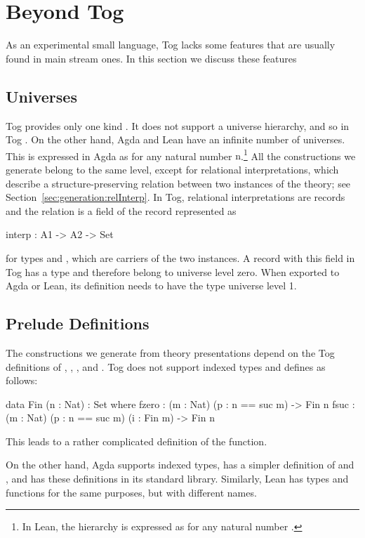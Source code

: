 \section{Beyond Tog}
\label{sec:beyongTog}
As an experimental small language, Tog lacks some features that are usually found in main stream ones. In this section we discuss these features 

\subsection{Universes}
Tog provides only one kind . It does not support a universe hierarchy, and so in Tog . On the other hand, Agda and Lean have an infinite number of universes. This is expressed in Agda as 
 for any natural number $\text{n}$.\footnote{In Lean, the hierarchy is expressed as  for any natural number .}
All the constructions we generate belong to the same level, except for relational interpretations, which describe a structure-preserving relation between two instances of the theory; see Section~\ref{sec:generation:relInterp}. In Tog, relational interpretations are records and the relation is a field of the record represented as 
\begin{togcode}
interp : A1 -> A2 -> Set
\end{togcode}
\noindent for types  and , which are carriers of the two instances. 
A record with this field in Tog has a type  and therefore belong to universe level zero. When exported to Agda or Lean, its definition needs to have the type universe level 1.  

\subsection{Prelude Definitions}
The constructions we generate from theory presentations depend on the Tog definitions of , , , and . Tog does not support indexed types and defines  as follows:
\begin{togcode}
data Fin (n : Nat) : Set where
  fzero : (m : Nat) (p : n == suc m) -> Fin n
  fsuc  : (m : Nat) (p : n == suc m) (i : Fin m) -> Fin n
\end{togcode}
\noindent This leads to a rather complicated definition of the  function. 

On the other hand, Agda supports indexed types, has a simpler definition of  and , and has these definitions in its standard library. Similarly, Lean has types and functions for the same purposes, but with different names.

